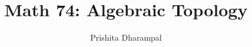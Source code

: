\title{Math 74: Algebraic Topology}

\author{Prishita Dharampal}
\date{}
\maketitle
\vspace{-0.3in}
